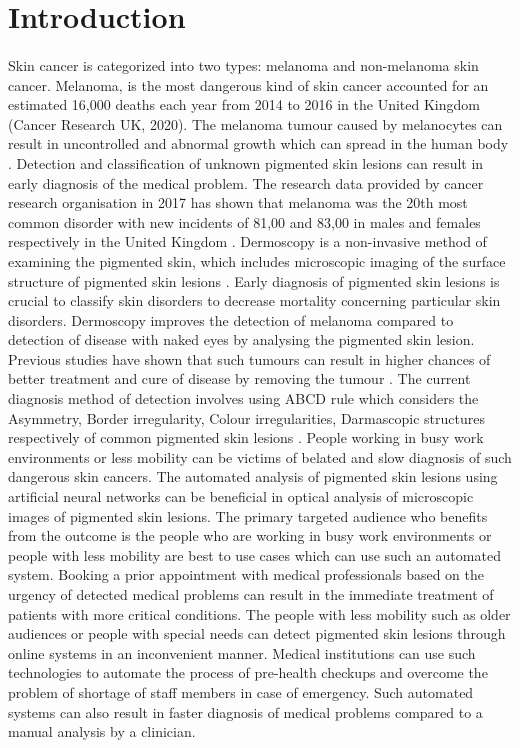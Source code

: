 \section{Introduction}
\paragraph*{}

Skin cancer is categorized into two types: melanoma and non-melanoma skin cancer. 
Melanoma, is the most dangerous kind of skin cancer accounted for an estimated 16,000 deaths 
each year from 2014 to 2016 in the United Kingdom (Cancer Research UK, 2020). 
The melanoma tumour caused by melanocytes can result in uncontrolled and abnormal growth which 
can spread in the human body \citep*{KOROTKOV201269}.
Detection and classification of unknown pigmented skin lesions can result in early diagnosis 
of the medical problem. The research data provided by cancer research organisation in 2017 has 
shown that melanoma was the 20th most common disorder with new incidents of 81,00 and 83,00 in males 
and females respectively in the United Kingdom \citep*{KOROTKOV201269}. 
Dermoscopy is a non-invasive method of examining the pigmented skin, which includes microscopic imaging of the surface structure of pigmented
skin lesions \citep*{KOROTKOV201269}.
Early diagnosis of pigmented skin lesions is crucial to classify skin disorders to decrease mortality concerning particular skin disorders. Dermoscopy improves the detection of melanoma compared to detection of disease with naked eyes by analysing the pigmented skin lesion. Previous studies have shown that such tumours can result in higher chances of better treatment and cure of disease by removing the tumour \citep*{CELEBI2007362}.
The current diagnosis method of detection involves using ABCD rule which considers the Asymmetry, Border irregularity, Colour irregularities, Darmascopic structures respectively of common pigmented skin lesions \citep*{LOESCHER2013170}.
People working in busy work environments or less mobility can be victims of belated and slow diagnosis of such dangerous skin cancers.
The automated analysis of pigmented skin lesions using artificial neural networks can be beneficial in optical analysis of microscopic images of pigmented skin lesions. 
The primary targeted audience who benefits from the outcome is the people who are working in busy work environments or people with less mobility are best to use cases which can use such an automated system. Booking a prior appointment with medical professionals based on the urgency of detected medical problems can result in the immediate treatment of patients with more critical conditions. The people with less mobility such as older audiences or people with special needs can detect pigmented skin lesions through online systems in an inconvenient manner. Medical institutions can use such technologies to automate the process of pre-health checkups and overcome the problem of shortage of staff members in case of emergency. Such automated systems can also result in faster diagnosis of medical problems compared to a manual analysis by a clinician. 
